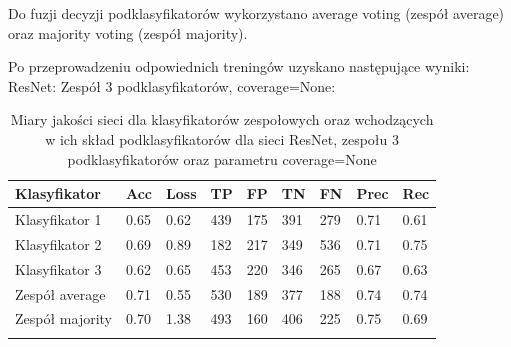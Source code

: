 \documentclass[polish,12pt]{aghthesis}
\begin{document}
\par\noindent Do fuzji decyzji podklasyfikatorów wykorzystano average voting (zespół average) oraz majority voting (zespół majority).
\par\noindent Po przeprowadzeniu odpowiednich treningów uzyskano następujące wyniki:
\vspace{3mm}
\newline\noindent ResNet:
\vspace{3mm}
\newline\noindent Zespół 3 podklasyfikatorów, coverage=None:
\renewcommand{\arraystretch}{1.75}
 \begin{longtable}[h!]{|m{2.6cm}|m{1.2cm}|m{1.2cm}|m{1.2cm}|m{1.2cm}|m{1.2cm}|m{1.2cm}|m{1.2cm}|m{1.2cm}|}
 \hline
 Klasyfikator & Acc & Loss & TP & FP & TN & FN & Prec & Rec\\
 \hline
 Klasyfikator 1 & 0.65 & 0.62 & 439 & 175 & 391 & 279 & 0.71 & 0.61\\
 \hline
 Klasyfikator 2 & 0.69 & 0.89 & 182 & 217 & 349 & 536 & 0.71 & 0.75\\
 \hline
 Klasyfikator 3 & 0.62 & 0.65 & 453 & 220 & 346 & 265 & 0.67 & 0.63\\
 \hline
 Zespół average & 0.71 & 0.55 & 530 & 189 & 377 & 188 & 0.74 & 0.74\\ 
 \hline
 Zespół \newline majority & 0.70 & 1.38 & 493 & 160 & 406 & 225 & 0.75 & 0.69\\
 \hline
\caption{Miary jakości sieci dla klasyfikatorów zespołowych oraz wchodzących w ich skład podklasyfikatorów dla sieci ResNet, zespołu 3 podklasyfikatorów oraz parametru coverage=None}
\label{table:17}
\end{longtable}
\end{document}
